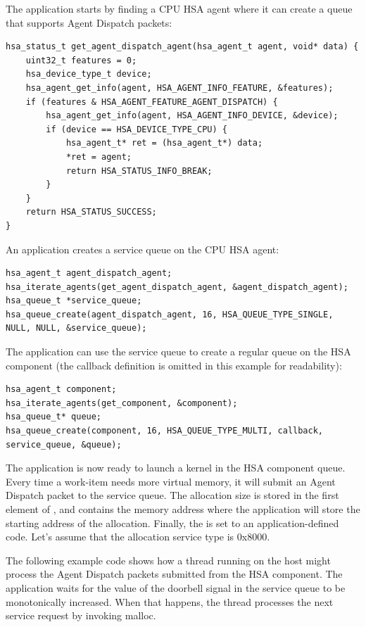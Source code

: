 \documentclass[final,oneside]{book}
\begin{document}
The application starts by finding a CPU HSA agent where it can create a queue
that supports Agent Dispatch packets:
\begin{lstlisting}
hsa_status_t get_agent_dispatch_agent(hsa_agent_t agent, void* data) {
    uint32_t features = 0;
    hsa_device_type_t device;
    hsa_agent_get_info(agent, HSA_AGENT_INFO_FEATURE, &features);
    if (features & HSA_AGENT_FEATURE_AGENT_DISPATCH) {
        hsa_agent_get_info(agent, HSA_AGENT_INFO_DEVICE, &device);
        if (device == HSA_DEVICE_TYPE_CPU) {
            hsa_agent_t* ret = (hsa_agent_t*) data;
            *ret = agent;
            return HSA_STATUS_INFO_BREAK;
        }
    }
    return HSA_STATUS_SUCCESS;
}
\end{lstlisting}
An application creates a service queue on the CPU HSA agent:
\begin{lstlisting}
hsa_agent_t agent_dispatch_agent;
hsa_iterate_agents(get_agent_dispatch_agent, &agent_dispatch_agent);
hsa_queue_t *service_queue;
hsa_queue_create(agent_dispatch_agent, 16, HSA_QUEUE_TYPE_SINGLE, NULL, NULL, &service_queue);
\end{lstlisting}
The application can use the service queue to create a regular queue on the HSA
component (the callback definition is omitted in this example for readability):
\begin{lstlisting}
hsa_agent_t component;
hsa_iterate_agents(get_component, &component);
hsa_queue_t* queue;
hsa_queue_create(component, 16, HSA_QUEUE_TYPE_MULTI, callback, service_queue, &queue);
\end{lstlisting}
The application is now ready to launch a kernel in the HSA component queue.
Every time a work-item needs more virtual memory, it will submit an Agent
Dispatch packet to the service queue. The allocation size is stored in the first
element of , and
 contains the memory address
where the application will store the starting address of the allocation.
Finally, the  is set to an
application-defined code. Let's assume that the allocation service type is
0x8000.

The following example code shows how a thread running on the host might process
the Agent Dispatch packets submitted from the HSA component. The application
waits for the value of the doorbell signal in the service queue to be
monotonically increased. When that happens, the thread processes the next service
request by invoking malloc.
\end{document}
